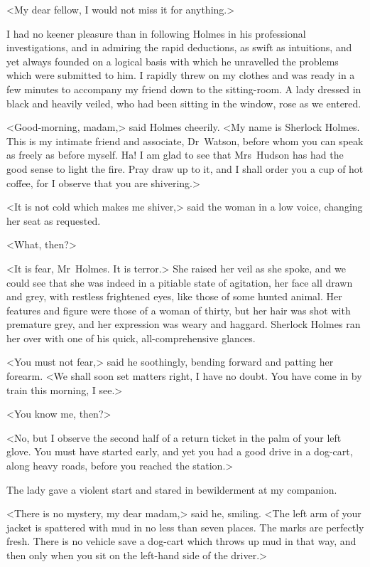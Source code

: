 <My dear fellow, I would not miss it for anything.>

I had no keener pleasure than in following Holmes in his professional investigations, and in admiring the rapid deductions, as swift as intuitions, and yet always founded on a logical basis with which he unravelled the problems which were submitted to him. I rapidly threw on my clothes and was ready in a few minutes to accompany my friend down to the sitting-room. A lady dressed in black and heavily veiled, who had been sitting in the window, rose as we entered.

<Good-morning, madam,> said Holmes cheerily. <My name is Sherlock Holmes. This is my intimate friend and associate, Dr~Watson, before whom you can speak as freely as before myself. Ha! I am glad to see that Mrs~Hudson has had the good sense to light the fire. Pray draw up to it, and I shall order you a cup of hot coffee, for I observe that you are shivering.>

<It is not cold which makes me shiver,> said the woman in a low voice, changing her seat as requested.

<What, then?>

<It is fear, Mr~Holmes. It is terror.> She raised her veil as she spoke, and we could see that she was indeed in a pitiable state of agitation, her face all drawn and grey, with restless frightened eyes, like those of some hunted animal. Her features and figure were those of a woman of thirty, but her hair was shot with premature grey, and her expression was weary and haggard. Sherlock Holmes ran her over with one of his quick, all-comprehensive glances.

<You must not fear,> said he soothingly, bending forward and patting her forearm. <We shall soon set matters right, I have no doubt. You have come in by train this morning, I see.>

<You know me, then?>

<No, but I observe the second half of a return ticket in the palm of your left glove. You must have started early, and yet you had a good drive in a dog-cart, along heavy roads, before you reached the station.>

The lady gave a violent start and stared in bewilderment at my companion.

<There is no mystery, my dear madam,> said he, smiling. <The left arm of your jacket is spattered with mud in no less than seven places. The marks are perfectly fresh. There is no vehicle save a dog-cart which throws up mud in that way, and then only when you sit on the left-hand side of the driver.>

